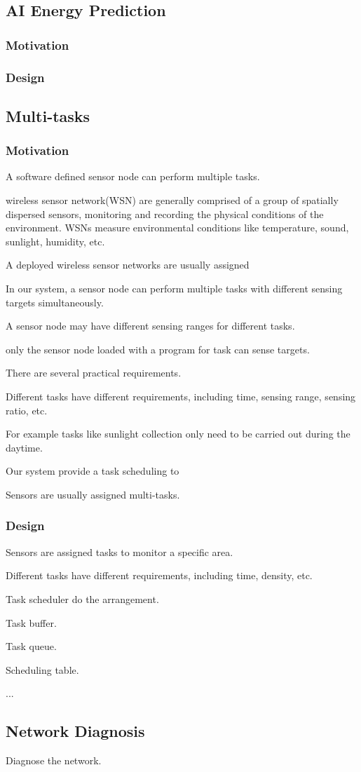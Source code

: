 \subsection{AI Energy Prediction}

\subsubsection{Motivation}

\subsubsection{Design}

\subsection{Multi-tasks}

\subsubsection{Motivation}

A software defined sensor node can perform multiple tasks.

wireless sensor network(WSN) are generally comprised of a group of 
spatially dispersed sensors, monitoring and recording the physical conditions
of the environment. WSNs measure environmental conditions like temperature, sound, sunlight,
humidity, etc.

A deployed wireless sensor networks are usually assigned  

In our system, a sensor node can perform multiple tasks with different sensing targets simultaneously.

A sensor node may have different sensing ranges for different tasks.

only the sensor node loaded with a program for task can sense targets.

There are several practical requirements.

Different tasks have different requirements, including time, sensing range, sensing ratio, etc.

For example tasks like sunlight collection only need to be carried out during the daytime.

Our system provide a task scheduling to 

Sensors are usually assigned multi-tasks.

\subsubsection{Design}

Sensors are assigned tasks to monitor a specific area.

Different tasks have different requirements, including time, density, etc.

Task scheduler do the arrangement. 

Task buffer.

Task queue.

Scheduling table.

...

\subsection{Network Diagnosis}

Diagnose the network.

